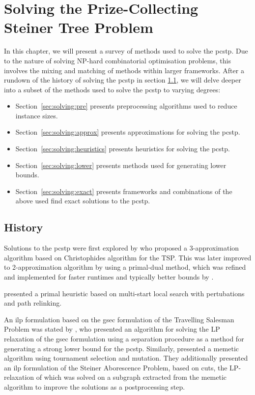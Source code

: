 \chapter{Solving the Prize-Collecting Steiner Tree Problem}
\label{chap:solving}

In this chapter, we will present a survey of methods used to solve the \gls{pcstp}. Due to the nature of solving
NP-hard combinatorial optimisation problems, this involves the mixing and matching of methods within larger frameworks.
 After a rundown of the history of solving the \gls{pcstp} in section \ref{sec:solving:history}, we will delve deeper into a subset of the methods used to solve the \gls{pcstp} to varying degrees:
\begin{itemize}
\item Section~\ref{sec:solving:pre} presents preprocessing algorithms used to reduce instance sizes.
\item Section~\ref{sec:solving:approx} presents approximations for solving the \gls{pcstp}.
\item Section~\ref{sec:solving:heuristics} presents heuristics for solving the \gls{pcstp}.
\item Section~\ref{sec:solving:lower} presents methods used for generating lower bounds.
\item Section~\ref{sec:solving:exact} presents frameworks and combinations of the above used find exact solutions
   to the \gls{pcstp}.
\end{itemize}

\section{History}
\label{sec:solving:history}

Solutions to the \gls{pcstp} were first explored by \citet{Bienstock1993} who
proposed a 3-approximation algorithm based on Christophides algorithm for the TSP.
This was later improved to 2-approximation algorithm by
\citet{goemans1997primal} using a primal-dual method,
which was refined and implemented
for faster runtimes and typically better
bounds by \citet{Johnson:2000:PCS:338219.338637}.

\citet{canuto2001local} presented a primal heuristic based on multi-start
local search with pertubations and path relinking.

An \gls{ilp} formulation based on the \gls{gsec} formulation of the Travelling Salesman Problem was
stated by \citet{lucena2004strong}, who presented an algorithm for solving the LP relaxation of the \gls{gsec} formulation using
a separation procedure as a method for generating a strong lower bound for the \gls{pcstp}. Similarly, \citet{Ljubic:2004:memetic}
presented a memetic algorithm using tournament selection and mutation. They additionally presented an \gls{ilp} formulation of the Steiner
 Aborescence Problem, based on cuts, the LP-relaxation of which was solved on a subgraph extracted from the memetic algorithm to
 improve the solutions as a postprocessing step.

